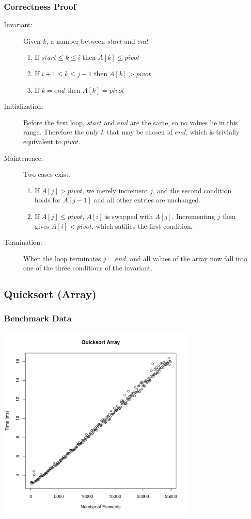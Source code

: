\documentclass[a4paper,12pt]{article}
\begin{document}
\subsubsection{Correctness Proof}
\begin{description}
\item [Invariant: ] Given $k$, a number between $start$ and $end$
  \begin{enumerate}
  \item If $start \leq k \leq i$ then $A[k] \leq pivot$
  \item If $i + 1 \leq k \leq j - 1$ then $A[k] > pivot$
  \item If $k = end$ then $A[k] = pivot$
  \end{enumerate}
\item [Initialization: ] Before the first loop, $start$ and $end$ are the same, so no values
  lie in this range. Therefore the only $k$ that may be chosen id $end$, which is trivially
  equivalent to $pivot$.
\item [Maintenence: ] Two cases exist.
  \begin{enumerate}
  \item If $A[j] > pivot$, we merely increment $j$, and the second condition holds for $A[j - 1]$ and all other
    entries are unchanged.
  \item If $A[j] \leq pivot$, $A[i]$ is swapped with $A[j]$. Incrementing $j$ then gives $A[i] < pivot$, which satifies
    the first condition.
  \end{enumerate}
\item [Termination: ] When the loop terminates $j = end$, and all values of the array now fall into one of the three
  conditions of the invariant.
\end{description}
\subsection{Quicksort (Array)}
\subsubsection{Benchmark Data}
\includegraphics[height=10cm]{quicksort_array}
\end{document}

